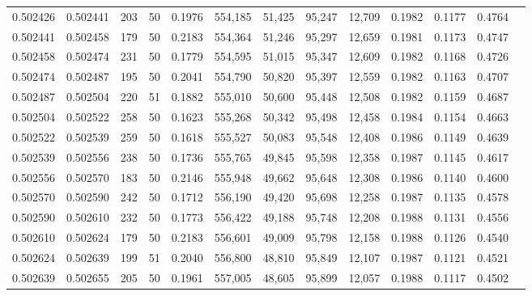 \begin{tabular}{rrrrrrrrrrrrr}
0.502426 & 0.502441 & 203 &  50 &                                     0.1976 & 554,185 &  51,425 &  95,247 &  12,709 & 0.1982 & 0.1177 & 0.4764 \\
0.502441 & 0.502458 & 179 &  50 &                                     0.2183 & 554,364 &  51,246 &  95,297 &  12,659 & 0.1981 & 0.1173 & 0.4747 \\
0.502458 & 0.502474 & 231 &  50 &                                     0.1779 & 554,595 &  51,015 &  95,347 &  12,609 & 0.1982 & 0.1168 & 0.4726 \\
0.502474 & 0.502487 & 195 &  50 &                                     0.2041 & 554,790 &  50,820 &  95,397 &  12,559 & 0.1982 & 0.1163 & 0.4707 \\
0.502487 & 0.502504 & 220 &  51 &                                     0.1882 & 555,010 &  50,600 &  95,448 &  12,508 & 0.1982 & 0.1159 & 0.4687 \\
0.502504 & 0.502522 & 258 &  50 &                                     0.1623 & 555,268 &  50,342 &  95,498 &  12,458 & 0.1984 & 0.1154 & 0.4663 \\
0.502522 & 0.502539 & 259 &  50 &                                     0.1618 & 555,527 &  50,083 &  95,548 &  12,408 & 0.1986 & 0.1149 & 0.4639 \\
0.502539 & 0.502556 & 238 &  50 &                                     0.1736 & 555,765 &  49,845 &  95,598 &  12,358 & 0.1987 & 0.1145 & 0.4617 \\
0.502556 & 0.502570 & 183 &  50 &                                     0.2146 & 555,948 &  49,662 &  95,648 &  12,308 & 0.1986 & 0.1140 & 0.4600 \\
0.502570 & 0.502590 & 242 &  50 &                                     0.1712 & 556,190 &  49,420 &  95,698 &  12,258 & 0.1987 & 0.1135 & 0.4578 \\
0.502590 & 0.502610 & 232 &  50 &                                     0.1773 & 556,422 &  49,188 &  95,748 &  12,208 & 0.1988 & 0.1131 & 0.4556 \\
0.502610 & 0.502624 & 179 &  50 &                                     0.2183 & 556,601 &  49,009 &  95,798 &  12,158 & 0.1988 & 0.1126 & 0.4540 \\
0.502624 & 0.502639 & 199 &  51 &                                     0.2040 & 556,800 &  48,810 &  95,849 &  12,107 & 0.1987 & 0.1121 & 0.4521 \\
0.502639 & 0.502655 & 205 &  50 &                                     0.1961 & 557,005 &  48,605 &  95,899 &  12,057 & 0.1988 & 0.1117 & 0.4502 \\

\end{tabular}
